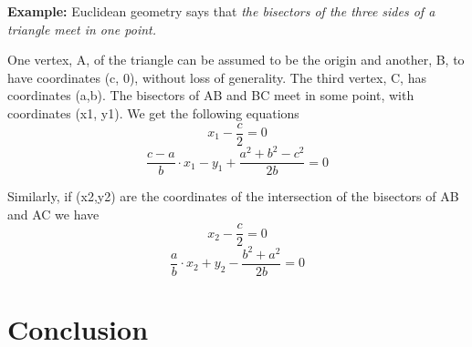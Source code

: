 \documentclass[11pt]{article}
\begin{document}
\textbf {Example:} Euclidean geometry says that \textit{the bisectors of the three sides of a triangle meet in one point.}

One vertex, A, of the triangle can be assumed to be the origin and another, B, to have coordinates (c, 0), without loss of generality. The third vertex, C, has coordinates (a,b).
The bisectors of AB and BC meet in some point, with coordinates (x1, y1). We get the following equations
\begin{equation}
    x_1- \frac {c}{2}=0
\end{equation}
\begin{equation}
    \frac {c-a}{b} \cdotp x_1 - y_1 + \frac {a^2 + b^2 - c^2}{2b} = 0
\end{equation}

Similarly, if (x2,y2) are the coordinates of the intersection of the bisectors of AB and AC we have
\begin{equation}
    x_2- \frac {c}{2}=0
\end{equation}
\begin{equation}
    \frac {a}{b} \cdotp x_2 + y_2 - \frac {b^2 + a^2}{2b} = 0
\end{equation}

\section{Conclusion}
\end{document}

